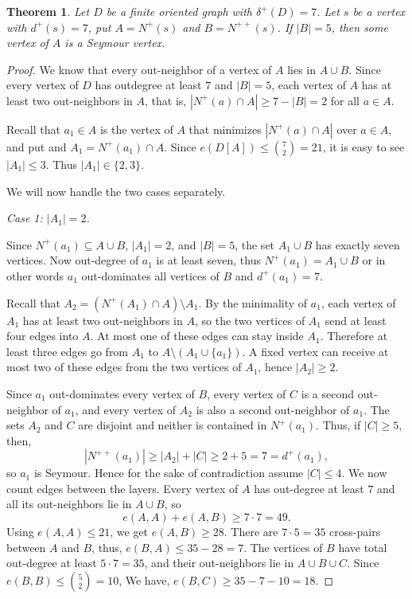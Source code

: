 \documentclass[10pt,a4paper]{amsart}
\newtheorem{theorem}{Theorem}
\begin{document}
\begin{theorem}
Let $D$ be a finite oriented graph with $\delta^+(D)=7$. Let $s$ be a vertex with $d^+(s)=7$, put $A=N^+(s)$ and $B=N^{++}(s)$. If $|B|=5$, then some vertex of $A$ is a Seymour vertex.
\end{theorem}

\begin{proof}
We know that every out-neighbor of a vertex of $A$ lies in $A\cup B$. Since every vertex of $D$ has outdegree at least $7$ and $|B|=5$, each vertex of $A$ has at least two out-neighbors in $A$, that is, $|N^+(a)\cap A|\ge 7-|B|=2$ for all $a\in A$.

Recall that $a_1\in A$ is the vertex of $A$ that minimizes $|N^+(a)\cap A|$ over $a\in A$, and put and $A_1=N^+(a_1)\cap A$.
Since $e(D[A])\leq \binom{7}{2}=21$, it is easy to see $|A_1|\leq 3$. Thus $|A_1|\in\{2,3\}$.

We will now handle the two cases separately.

\medskip
\noindent\emph{Case 1: $|A_1|=2$.}


Since $N^+(a_1)\subseteq A\cup B$, $|A_1|=2$, and $|B|=5$, the set $A_1\cup B$ has exactly seven vertices. Now out-degree of $a_1$ is at least seven, thus $N^+(a_1)=A_1\cup B$ or in other words $a_1$ out-dominates all vertices of $B$ and $d^+(a_1)=7$.

Recall that $A_2=(N^+(A_1)\cap A)\setminus A_1.$ By the minimality of $a_1$, each vertex of $A_1$ has at least two out-neighbors in $A$, so the two vertices of $A_1$ send at least four edges into $A$. At most one of these edges can stay inside $A_1$. Therefore at least three edges go from $A_1$ to $A\setminus (A_1\cup\{a_1\})$. A fixed vertex can receive at most two of these edges from the two vertices of $A_1$, hence $|A_2|\geq 2$.


Since $a_1$ out-dominates every vertex of $B$, every vertex of $C$ is a second out-neighbor of $a_1$, and every vertex of $A_2$ is also a second out-neighbor of $a_1$. The sets $A_2$ and $C$ are disjoint and neither is contained in $N^+(a_1)$. Thus, if $|C|\ge 5$, then,
\[
|N^{++}(a_1)|\ge |A_2|+|C|\ge 2+5=7=d^+(a_1),
\]
so $a_1$ is Seymour. Hence for the sake of contradiction assume $ |C|\le 4.$
We now count edges between the layers. Every vertex of $A$ has out-degree at least $7$ and all its out-neighbors lie in $A\cup B$, so
\[
e(A,A)+e(A,B)\ge 7\cdot 7=49.
\]
Using $e(A,A)\le 21$, we get $e(A,B)\ge 28.$ There are $7\cdot 5=35$ cross-pairs between $A$ and $B$, thus, $e(B,A)\le 35-28=7.$
The vertices of $B$ have total out-degree at least $5\cdot 7=35$, and their out-neighbors lie in $A\cup B\cup C$. Since $e(B,B)\le \binom{5}{2}=10$, We have,
$e(B,C)\ge 35-7-10=18$.


\end{proof}
\end{document}
